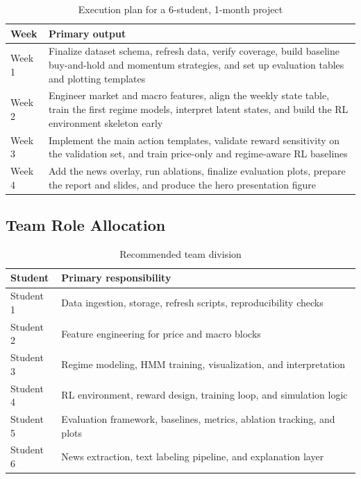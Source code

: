 \documentclass[11pt,a4paper]{article}
\begin{document}
\begin{table}[H]
\centering
\caption{Execution plan for a 6-student, 1-month project}
\begin{tabularx}{\textwidth}{@{}P{0.16\textwidth}Y@{}}
\toprule
{}
\textbf{Week} & \textbf{Primary output} \\
\midrule
Week 1 & Finalize dataset schema, refresh data, verify coverage, build baseline buy-and-hold and momentum strategies, and set up evaluation tables and plotting templates \\
Week 2 & Engineer market and macro features, align the weekly state table, train the first regime models, interpret latent states, and build the RL environment skeleton early \\
Week 3 & Implement the main action templates, validate reward sensitivity on the validation set, and train price-only and regime-aware RL baselines \\
Week 4 & Add the news overlay, run ablations, finalize evaluation plots, prepare the report and slides, and produce the hero presentation figure \\
\bottomrule
\end{tabularx}
\end{table}

\subsection{Team Role Allocation}

\begin{table}[H]
\centering
\caption{Recommended team division}
\begin{tabularx}{\textwidth}{@{}P{0.18\textwidth}Y@{}}
\toprule
{}
\textbf{Student} & \textbf{Primary responsibility} \\
\midrule
Student 1 & Data ingestion, storage, refresh scripts, reproducibility checks \\
Student 2 & Feature engineering for price and macro blocks \\
Student 3 & Regime modeling, HMM training, visualization, and interpretation \\
Student 4 & RL environment, reward design, training loop, and simulation logic \\
Student 5 & Evaluation framework, baselines, metrics, ablation tracking, and plots \\
Student 6 & News extraction, text labeling pipeline, and explanation layer \\
\bottomrule
\end{tabularx}
\end{table}
\end{document}
